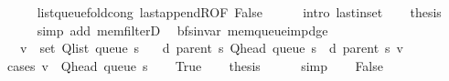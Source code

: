 \begin{isabellebody}
\ \ \ \ \isamarkupfalse%
\ list{\isacharunderscore}{\kern0pt}queue{\isacharunderscore}{\kern0pt}fold{\isacharunderscore}{\kern0pt}cong\ last{\isacharunderscore}{\kern0pt}appendR{\isacharbrackleft}{\kern0pt}OF\ False{\isacharbrackright}{\kern0pt}\isanewline
\ \ \ \ \isamarkupfalse%
\ {\isacharparenleft}{\kern0pt}intro\ last{\isacharunderscore}{\kern0pt}in{\isacharunderscore}{\kern0pt}set{\isacharparenright}{\kern0pt}\isanewline
\ \ \isamarkupfalse%
\ {\isacharquery}{\kern0pt}thesis\isanewline
\ \ \ \ \isamarkupfalse%
\ {\isacharparenleft}{\kern0pt}simp\ add{\isacharcolon}{\kern0pt}\ mem{\isacharunderscore}{\kern0pt}filterD{\isacharparenleft}{\kern0pt}{}{\isacharparenright}{\kern0pt}{\isacharparenright}{\kern0pt}\isanewline
{}\isamarkupfalse%
%
\endisatagproof
{\isafoldproof}%
%
\isadelimproof
\isanewline
%
\endisadelimproof
\isanewline
{}\isamarkupfalse%
\ {\isacharparenleft}{\kern0pt}\ bfs{\isacharunderscore}{\kern0pt}invar{\isacharparenright}{\kern0pt}\ mem{\isacharunderscore}{\kern0pt}queue{\isacharunderscore}{\kern0pt}imp{\isacharunderscore}{\kern0pt}d{\isacharunderscore}{\kern0pt}ge{\isacharcolon}{\kern0pt}\isanewline
\ \ \ {\isachardoublequoteopen}v\ {\isasymin}\ set\ {\isacharparenleft}{\kern0pt}Q{\isacharunderscore}{\kern0pt}list\ {\isacharparenleft}{\kern0pt}queue\ s{\isacharparenright}{\kern0pt}{\isacharparenright}{\kern0pt}{\isachardoublequoteclose}\isanewline
\ \ \ {\isachardoublequoteopen}d\ {\isacharparenleft}{\kern0pt}parent\ s{\isacharparenright}{\kern0pt}\ {\isacharparenleft}{\kern0pt}Q{\isacharunderscore}{\kern0pt}head\ {\isacharparenleft}{\kern0pt}queue\ s{\isacharparenright}{\kern0pt}{\isacharparenright}{\kern0pt}\ {\isasymle}\ d\ {\isacharparenleft}{\kern0pt}parent\ s{\isacharparenright}{\kern0pt}\ v{\isachardoublequoteclose}\isanewline
%
\isadelimproof
%
\endisadelimproof
%
\isatagproof
{}\isamarkupfalse%
\ {\isacharparenleft}{\kern0pt}cases\ {\isachardoublequoteopen}v\ {\isacharequal}{\kern0pt}\ Q{\isacharunderscore}{\kern0pt}head\ {\isacharparenleft}{\kern0pt}queue\ s{\isacharparenright}{\kern0pt}{\isachardoublequoteclose}{\isacharparenright}{\kern0pt}\isanewline
\ \ \isamarkupfalse%
\ True\isanewline
\ \ \isamarkupfalse%
\ {\isacharquery}{\kern0pt}thesis\isanewline
\ \ \ \ \isamarkupfalse%
\ simp\isanewline
{}\isamarkupfalse%
\isanewline
\ \ \isamarkupfalse%
\ False\isanewline

\end{isabellebody}
